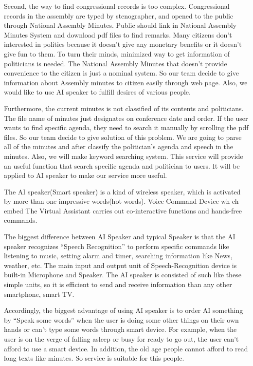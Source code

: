\documentclass[conference]{IEEEtran}
\begin{document}
Second, the way to find congressional records is too complex. Congressional records in the assembly are typed by stenographer, and opened to the public through National Assembly Minutes. Public should link in National Assembly Minutes System and download pdf files to find remarks. Many citizens don’t interested in politics because it doesn’t give any monetary benefits or it doesn’t give fun to them. To turn their minds, minimized way to get information of politicians is needed. The National Assembly Minutes that doesn’t provide convenience to the citizen is just a nominal system. So our team decide to give information about Assembly minutes to citizen easily through web page. Also, we would like to use AI speaker to fulfill desires of various people.

Furthermore, the current minutes is not classified of its contents and politicians. The file name of minutes just designates on conference date and order. If the user wants to find specific agenda, they need to search it manually by scrolling the pdf files. So our team decide to give solution of this problem. We are going to parse all of the minutes and after classify the politician’s agenda and speech in the minutes. Also, we will make keyword searching system. This service will provide an useful function that search specific agenda and politician to users. It will be applied to AI speaker to make our service more useful.

The AI speaker(Smart speaker) is a kind of wireless speaker, which is activated by more than one impressive words(hot words). Voice-Command-Device wh ch embed The Virtual Assistant carries out co-interactive functions and hands-free commands.

The biggest difference between AI Speaker and typical Speaker is that the AI speaker recognizes “Speech Recognition” to perform specific commands like listening to music, setting alarm and timer, searching information like News, weather, etc. The main input and output unit of Speech-Recognition device is built-in Microphone and Speaker. The AI speaker is consisted of such like these simple units, so it is efficient to send and receive information than any other smartphone, smart TV.

Accordingly, the biggest advantage of using AI speaker is to order AI something by “Speak some words” when the user is doing some other things on their own hands or can’t type some words through smart device. For example, when the user is on the verge of falling asleep or busy for ready to go out, the user can’t afford to use a smart device. In addition, the old age people cannot afford to read long texts like minutes. So service is suitable for this people.
\end{document}
